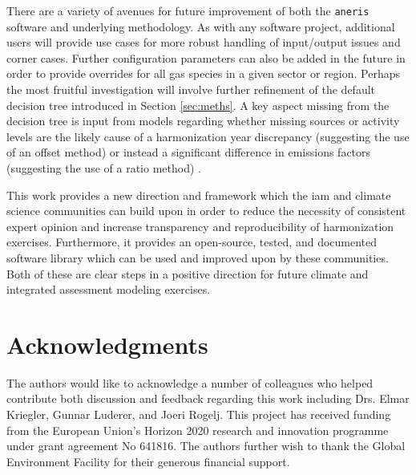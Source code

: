 \documentclass[review]{elsarticle}
\newcommand{\code}[1]{\lstinline[basicstyle=\ttfamily\color{black}]|#1|}
\begin{document}
There are a variety of avenues for future improvement of both the \code{aneris}
software and underlying methodology. As with any software project, additional
users will provide use cases for more robust handling of input/output issues
and corner cases. Further configuration parameters can also be added in the
future in order to provide overrides for all gas species in a given sector or
region. Perhaps the most fruitful investigation will involve further refinement
of the default decision tree introduced in Section \ref{sec:meths}. A key aspect
missing from the decision tree is input from models regarding whether missing
sources or activity levels are the likely cause of a harmonization year
discrepancy (suggesting the use of an offset method) or instead a significant
difference in emissions factors (suggesting the use of a ratio method)
\cite{rogelj_discrepancies_2011}.

This work provides a new direction and framework which the \gls{iam} and climate
science communities can build upon in order to reduce the necessity of
consistent expert opinion and increase transparency and reproducibility of
harmonization exercises. Furthermore, it provides an open-source, tested, and
documented software library which can be used and improved upon by these
communities. Both of these are clear steps in a positive direction for future
climate and integrated assessment modeling exercises.

\section*{Acknowledgments}

The authors would like to acknowledge a number of colleagues who helped
contribute both discussion and feedback regarding this work including Drs. Elmar
Kriegler, Gunnar Luderer, and Joeri Rogelj. This project has received funding
from the European Union’s Horizon 2020 research and innovation programme under
grant agreement No 641816. The authors further wish to thank the Global
Environment Facility for their generous financial support.

\newpage
\printglossaries

\newpage
\section*{\refname}

\end{document}
